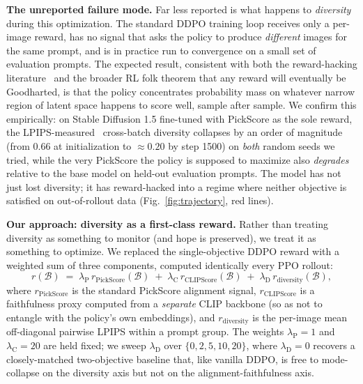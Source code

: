 \documentclass[10pt,letterpaper]{article}
\newcommand{\paragraphhead}[1]{\vspace{0.4ex}\noindent\textbf{#1}\hspace{0.5em}}
\newcommand{\pickscore}{\mathrm{PickScore}}
\newcommand{\clipscore}{\mathrm{CLIPScore}}
\newcommand{\lambdaP}{\lambda_{\mathrm{P}}}
\newcommand{\lambdaC}{\lambda_{\mathrm{C}}}
\newcommand{\lambdaD}{\lambda_{\mathrm{D}}}
\begin{document}
\paragraphhead{The unreported failure mode.}
Far less reported is what happens to \emph{diversity} during this optimization. The standard DDPO training loop receives only a per-image reward, has no signal that asks the policy to produce \emph{different} images for the same prompt, and is in practice run to convergence on a small set of evaluation prompts. The expected result, consistent with both the reward-hacking literature~\citep{Skalse22} and the broader RL folk theorem that any reward will eventually be Goodharted, is that the policy concentrates probability mass on whatever narrow region of latent space happens to score well, sample after sample. We confirm this empirically: on Stable Diffusion 1.5 fine-tuned with PickScore as the sole reward, the LPIPS-measured~\citep{Zhang18} cross-batch diversity collapses by an order of magnitude (from $0.66$ at initialization to $\approx 0.20$ by step 1500) on \emph{both} random seeds we tried, while the very PickScore the policy is supposed to maximize also \emph{degrades} relative to the base model on held-out evaluation prompts. The model has not just lost diversity; it has reward-hacked into a regime where neither objective is satisfied on out-of-rollout data (Fig.~\ref{fig:trajectory}, red lines).

\paragraphhead{Our approach: diversity as a first-class reward.}
Rather than treating diversity as something to monitor (and hope is preserved), we treat it as something to optimize. We replaced the single-objective DDPO reward with a weighted sum of three components, computed identically every PPO rollout:
\begin{equation}
  r(\mathcal{B}) \;=\; \lambdaP\, r_{\pickscore}(\mathcal{B}) \;+\; \lambdaC\, r_{\clipscore}(\mathcal{B}) \;+\; \lambdaD\, r_{\mathrm{diversity}}(\mathcal{B}),
\label{eq:multiobj}
\end{equation}
where $r_{\pickscore}$ is the standard PickScore alignment signal, $r_{\clipscore}$ is a faithfulness proxy computed from a \emph{separate} CLIP backbone (so as not to entangle with the policy's own embeddings), and $r_{\mathrm{diversity}}$ is the per-image mean off-diagonal pairwise LPIPS within a prompt group. The weights $\lambdaP{=}1$ and $\lambdaC{=}20$ are held fixed; we sweep $\lambdaD$ over $\{0, 2, 5, 10, 20\}$, where $\lambdaD = 0$ recovers a closely-matched two-objective baseline that, like vanilla DDPO, is free to mode-collapse on the diversity axis but not on the alignment-faithfulness axis.
\end{document}
